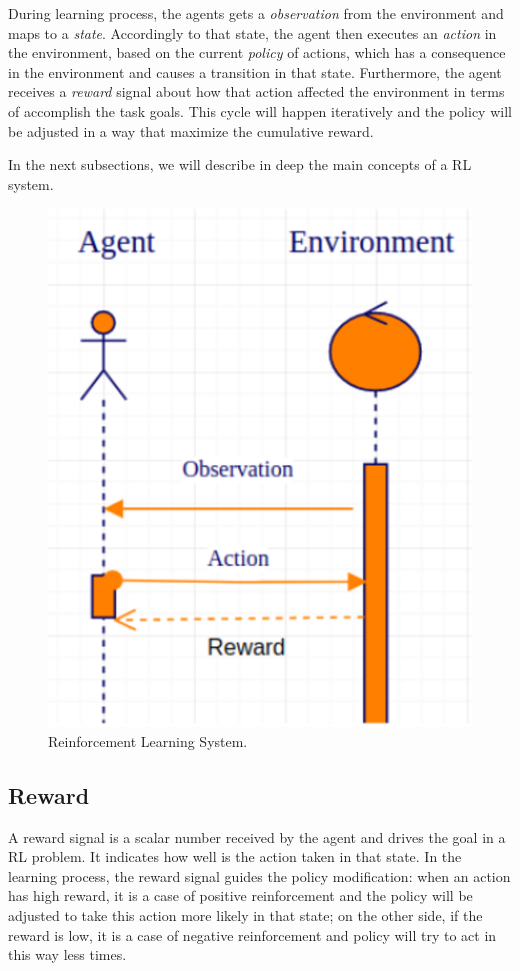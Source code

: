 During learning process, the agents gets a \textit{observation} from the environment and maps to a \textit{state}. Accordingly to that state, the agent then executes an \textit{action} in the environment, based on the current \textit{policy} of actions, which has a consequence in the environment and causes a transition in that state. Furthermore, the agent receives a \textit{reward} signal about how that action affected the environment in terms of accomplish the task goals. This cycle will happen iteratively and the policy will be adjusted in a way that maximize the cumulative reward.

In the next subsections, we will describe in deep the main concepts of a RL system.

\begin{figure}[!htpb]
	\centering
	\includegraphics[scale=0.5]{Cap4/rlsystem.eps}
	\caption{Reinforcement Learning System.}
	\label{fig:rlsystem}
\end{figure}

\subsection{Reward}\label{sec:reward}
A reward signal is a scalar number received by the agent and drives the goal in a RL problem. It indicates how well is the action taken in that state. In the learning process, the reward signal guides the policy modification: when an action has high reward, it is a case of positive reinforcement and the policy will be adjusted to take this action more likely in that state; on the other side, if the reward is low, it is a case of negative reinforcement and policy will try to act in this way less times.


